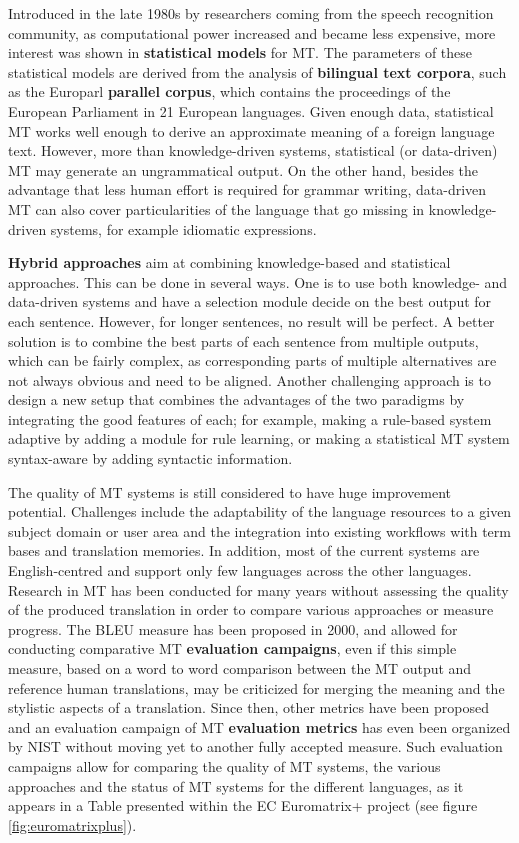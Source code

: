 \begin{multicols}{2}
Introduced in the late 1980s by researchers coming from the speech
recognition community, as computational power increased and became
less expensive, more interest was shown in {\bf statistical models} for
MT. The parameters of these statistical models are derived from the
analysis of {\bf bilingual text corpora}, such as the Europarl {\bf parallel
corpus}, which contains the proceedings of the European Parliament in
21 European languages. Given enough data, statistical MT works well
enough to derive an approximate meaning of a foreign language
text. However, more than knowledge-driven systems, statistical (or
data-driven) MT may generate an ungrammatical output. On the other
hand, besides the advantage that less human effort is required for
grammar writing, data-driven MT can also cover particularities of the
language that go missing in knowledge-driven systems, for example
idiomatic expressions.

{\bf Hybrid approaches} aim at combining knowledge-based and statistical
approaches. This can be done in several ways. One is to use both
knowledge- and data-driven systems and have a selection module decide
on the best output for each sentence. However, for longer sentences,
no result will be perfect. A better solution is to combine the best
parts of each sentence from multiple outputs, which can be fairly
complex, as corresponding parts of multiple alternatives are not
always obvious and need to be aligned. Another challenging approach is
to design a new setup that combines the advantages of the two
paradigms by integrating the good features of each; for example,
making a rule-based system adaptive by adding a module for rule
learning, or making a statistical MT system syntax-aware by adding
syntactic information.

The quality of MT systems is still considered to have huge improvement
potential. Challenges include the adaptability of the language
resources to a given subject domain or user area and the integration
into existing workflows with term bases and translation memories. In
addition, most of the current systems are English-centred and support
only few languages across the other languages. Research in MT has been
conducted for many years without assessing the quality of the produced
translation in order to compare various approaches or measure
progress. The BLEU measure has been proposed in 2000\cite{bleu02}, and allowed for
conducting comparative MT {\bf evaluation campaigns}, even if this simple
measure, based on a word to word comparison between the MT output and
reference human translations, may be criticized for merging the
meaning and the stylistic aspects of a translation. Since then, other
metrics have been proposed and an evaluation campaign of MT {\bf evaluation
metrics} has even been organized by NIST without moving yet to another
fully accepted measure. Such evaluation campaigns allow for comparing
the quality of MT systems, the various approaches and the status of MT
systems for the different languages, as it appears in a Table
presented within the EC Euromatrix+ project (see figure \ref{fig:euromatrixplus}).


\end{multicols}
